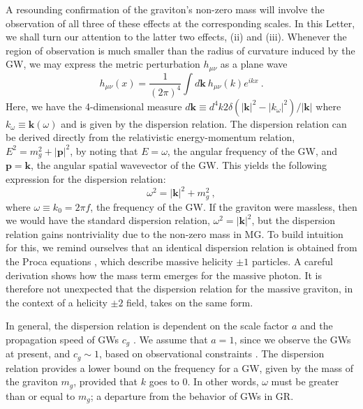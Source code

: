 \documentclass[10pt,prd,twocolumn,aps,nofootinbib,nobibnotes,superscriptaddress,preprintnumbers]{revtex4-2}
\begin{document}
A resounding confirmation of the graviton's non-zero mass will involve the observation of all three of these effects at the corresponding scales. In this Letter, we shall turn our attention to the latter two effects, (ii) and (iii). Whenever the region of observation is much smaller than the radius of curvature induced by the GW, we may express the metric perturbation $h_{\mu\nu}$ as a plane wave \cite{Isi:2018miq}
\begin{equation}\label{eqn:planewave}
    h_{\mu\nu}(x) = \frac{1}{(2\pi)^4}\int d\boldsymbol{k} \ h_{\mu\nu}(k) e^{ikx} \ .
\end{equation}
Here, we have the 4-dimensional measure $d\boldsymbol{k} \equiv d^4 k 2\delta(|\boldsymbol{k}|^2 - |k_{\omega}|^2)/|\boldsymbol{k}|$ where $k_{\omega} \equiv \boldsymbol{k}(\omega)$ and is given by the dispersion relation. The dispersion relation can be derived directly from the relativistic energy-momentum relation, $E^2 = m_g^2 + |{\boldsymbol{p}}|^2$, by noting that $E = \omega$, the angular frequency of the GW, and ${\boldsymbol{p}} = \boldsymbol{k}$, the angular spatial wavevector of the GW. This yields the following expression for the dispersion relation: 
\begin{equation}\label{eq:dispersion}
    \omega^2 = |\boldsymbol{k}|^2+ m_g^2 \ ,
\end{equation}
where $\omega \equiv k_0 = 2\pi f$, the frequency of the GW. If the graviton were massless, then we would have the standard dispersion relation, $\omega^2 = |\boldsymbol{k}|^2$, but the dispersion relation gains nontriviality due to the non-zero mass in MG. 
To build intuition for this, we remind ourselves that an identical dispersion relation is obtained from the Proca equations \cite{Proca:1936fbw}, which describe massive helicity $\pm 1$ particles. A careful derivation shows how the mass term emerges \cite{Wang:2024kir} for the massive photon. It is therefore not unexpected that the dispersion relation for the massive graviton, in the context of a helicity $\pm 2$ field, takes on the same form. 

In general, the dispersion relation is dependent on the scale factor $a$ and the propagation speed of GWs $c_g$ \cite{Gumrukcuoglu:2012wt}. We assume that $a=1$, since we observe the GWs at present, and $c_g \sim  1$, based on observational constraints \cite{LIGOScientific:2017vwq, LIGOScientific:2017zic, LIGOScientific:2017ync}.
The dispersion relation provides a lower bound on the frequency for a GW, given by the mass of the graviton $m_g$, provided that $k$ goes to 0. In other words, $\omega$ must be greater than or equal to $m_g$; a departure from the behavior of GWs in GR.
\end{document}
